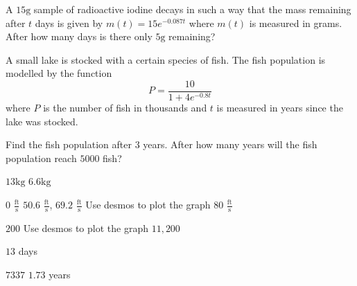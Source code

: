 \begin{Exercise}[title={Modelling},label=exModelling]
\Question A $15 \mbox{g}$ sample of radioactive iodine decays in such a way that the mass remaining after $t$ days is given by $m \left (t\right ) =15 e^{ -0.087 t}$ where $m (t)$ is measured in grams. After how many days is there only $5 \mbox{g}$ remaining? %

\Question A small lake is stocked with a certain species of fish. The fish population is modelled by the function
\begin{equation*}P =\frac{10}{1 +4 e^{ -0.8 t}}
\end{equation*} where $P$ is the number of fish in thousands and $t$ is measured in years since the lake was stocked. 
\begin{tasks}
\task Find the fish population after $3$ years. %
\task After how many years will the fish population reach $5000$ fish? %
\end{tasks}
\end{Exercise}
\begin{Answer}[ref={exModelling}]
\Question %
\begin{tasks}
	\task $13 \mbox{kg}$
	\task $6.6 \mbox{kg}$ 
\end{tasks}

\Question %
\begin{tasks}
	\task $0$ $\frac{\text{ft}}{\text{s}}$
	\task $50.6$  $\frac{\text{ft}}{\text{s}}$, $69.2$ $\frac{\text{ft}}{\text{s}}$
	\task Use desmos to plot the graph
	\task $80$ $\frac{\text{ft}}{\text{s}}$
\end{tasks}

\Question %
\begin{tasks}
	\task $200$
	\task Use desmos to plot the graph
	\task $11,200$
\end{tasks}

\Question %
$13$ days

\Question %
\begin{tasks}
	\task $7337$
	\task $1.73$ years 
\end{tasks}
\end{Answer}%

